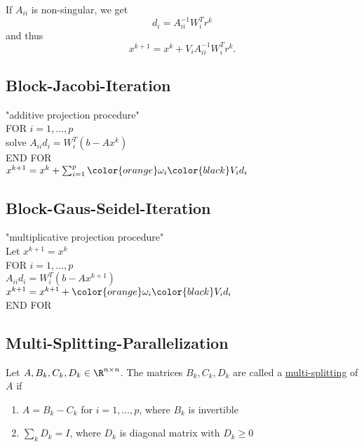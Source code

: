 If $A_{ii}$ is non-singular, we get
\[
d_{i} = A_{ii}^{-1} W_{i}^{T} r^{k}
\] 
and thus
\[
x^{k+1} = x^{k}+ V_{i}A_{ii}^{-1}W_{i}^{T} r^{k}
.\] 


\subsection*{Block-Jacobi-Iteration}
\label{sec:Block-Jacobi-Iteration}
"additive projection procedure"\\

FOR $i=1, \ldots, p$\\
\tab	solve $A_{ii}d_{i} = W_{i}^{T}(b-Ax^{k})$\\
END FOR\\
$x^{k+1}= x^{k} + \sum_{i=1}^{p}{\color{orange}\omega _{i}\color{black}V_{i}d_{i}}$

\subsection*{Block-Gaus-Seidel-Iteration}
\label{sec:Block-Jacobi-Iteration}
"multiplicative projection procedure"\\

Let $x^{k+1} = x^{k}$\\
FOR $i=1, \ldots, p$\\
\tab 	$A_{ii}d_{i} = W_{i}^{T}(b-Ax^{k+1})$\\
\tab 	$x^{k+1} = x^{k+1} +\color{orange}\omega _{i}\color{black} V_{i}d_{i}$\\
END FOR

\subsection*{Multi-Splitting-Parallelization}
\label{sec:Multi-Splitting-Parallelization}

\begin{definition}
	Let $A, B_{k}, C_{k}, D_{k}\in \R^{n \times n}$.
	The matrices $B_{k}, C_{k}, D_{k}$ are called a \underline{multi-splitting} of $A$ if
	\begin{enumerate}[label=(\arabic{enumi})]
		\item $A = B_{k} - C_{k}$ for $i=1, \ldots, p$, where $B_{k}$ is invertible
		\item $\sum_{k}^{}{D_{k}} = I$, where $D_{k}$ is diagonal matrix with $D_{k} \geq  0$
	\end{enumerate}
\end{definition}

